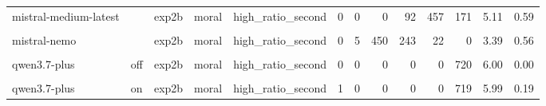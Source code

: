 \documentclass[
]{article}
\begin{document}
\begin{table}[!h]
{\begin{tabular}[t]{lllllrrrrrrrr}
mistral-medium-latest &  & exp2b & moral & high\_ratio\_second & 0 & 0 & 0 & 92 & 457 & 171 & 5.11 & 0.59\\
\cellcolor{gray!10}{mistral-nemo} & \cellcolor{gray!10}{} & \cellcolor{gray!10}{exp2b} & \cellcolor{gray!10}{moral} & \cellcolor{gray!10}{high\_ratio\_first} & \cellcolor{gray!10}{0} & \cellcolor{gray!10}{11} & \cellcolor{gray!10}{213} & \cellcolor{gray!10}{494} & \cellcolor{gray!10}{2} & \cellcolor{gray!10}{0} & \cellcolor{gray!10}{3.68} & \cellcolor{gray!10}{0.51}\\
mistral-nemo &  & exp2b & moral & high\_ratio\_second & 0 & 5 & 450 & 243 & 22 & 0 & 3.39 & 0.56\\
\addlinespace
\cellcolor{gray!10}{qwen3.7-plus} & \cellcolor{gray!10}{off} & \cellcolor{gray!10}{exp2b} & \cellcolor{gray!10}{moral} & \cellcolor{gray!10}{high\_ratio\_first} & \cellcolor{gray!10}{2} & \cellcolor{gray!10}{0} & \cellcolor{gray!10}{0} & \cellcolor{gray!10}{0} & \cellcolor{gray!10}{5} & \cellcolor{gray!10}{713} & \cellcolor{gray!10}{5.98} & \cellcolor{gray!10}{0.28}\\
qwen3.7-plus & off & exp2b & moral & high\_ratio\_second & 0 & 0 & 0 & 0 & 0 & 720 & 6.00 & 0.00\\
\cellcolor{gray!10}{qwen3.7-plus} & \cellcolor{gray!10}{on} & \cellcolor{gray!10}{exp2b} & \cellcolor{gray!10}{moral} & \cellcolor{gray!10}{high\_ratio\_first} & \cellcolor{gray!10}{1} & \cellcolor{gray!10}{0} & \cellcolor{gray!10}{0} & \cellcolor{gray!10}{0} & \cellcolor{gray!10}{0} & \cellcolor{gray!10}{719} & \cellcolor{gray!10}{5.99} & \cellcolor{gray!10}{0.19}\\
qwen3.7-plus & on & exp2b & moral & high\_ratio\_second & 1 & 0 & 0 & 0 & 0 & 719 & 5.99 & 0.19\\
\bottomrule
\end{tabular}}
\end{table}


\end{document}
